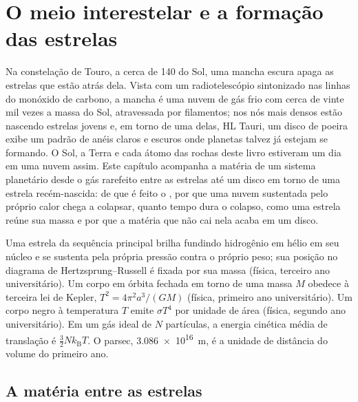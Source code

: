 \chapter{O meio interestelar e a formação das estrelas}\label{ch:b2:ism-star-formation}

Na constelação de Touro, a cerca de \qty{140}{\parsec} do Sol, uma mancha
escura apaga as estrelas que estão atrás dela. Vista com um radiotelescópio
sintonizado nas linhas do monóxido de carbono, a mancha é uma nuvem de gás frio
com cerca de vinte mil vezes a massa do Sol, atravessada por filamentos; nos
nós mais densos estão nascendo estrelas jovens e, em torno de uma delas, HL Tauri, um disco de
poeira exibe um padrão de anéis claros e escuros onde planetas talvez já estejam
se formando. O Sol, a Terra e cada átomo das rochas deste livro estiveram um dia
em uma nuvem assim. Este capítulo acompanha a matéria de um sistema planetário desde
o gás rarefeito entre as estrelas até um disco em torno de uma estrela recém-nascida: de que é feito o
, por que uma nuvem sustentada pelo próprio calor chega a
colapsar, quanto tempo dura o colapso, como uma estrela reúne sua massa e
por que a matéria que não cai nela acaba em um disco.

\begin{recall}
Uma estrela da sequência principal brilha fundindo hidrogênio em hélio em seu
núcleo e se sustenta pela própria pressão contra o próprio peso; sua
posição no diagrama de Hertzsprung--Russell é fixada por sua massa (física,
terceiro ano universitário). Um corpo em órbita fechada em torno de uma massa $M$ obedece à
terceira lei de Kepler, $T^2 = 4\pi^2 a^3/(GM)$ (física, primeiro ano universitário). Um corpo negro
à temperatura $T$ emite $\sigma T^4$ por unidade de área (física, segundo ano
universitário). Em um gás ideal de $N$ partículas, a energia cinética média de
translação é $\tfrac32 N k_{\mathrm B} T$. O parsec,
\qty{3.086e16}{m}, é a unidade de distância do volume do primeiro ano.
\end{recall}

\section{A matéria entre as estrelas}

